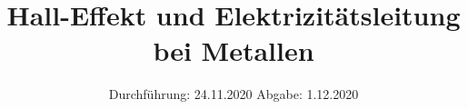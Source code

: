 

\subject{Versuch Nr.311}
\title{Hall-Effekt und Elektrizitätsleitung bei Metallen}
\date{%
  Durchführung: 24.11.2020
  \hspace{3em}
  Abgabe: 1.12.2020
}



\maketitle
\thispagestyle{empty}
\tableofcontents
\newpage 








\nocite{*}

\printbibliography{}


